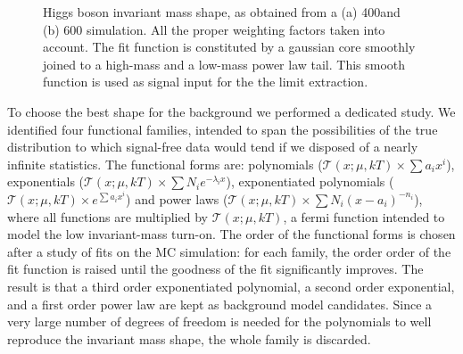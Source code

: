 \begin{figure}[htb]
\begin{center}
  \caption{Higgs boson invariant mass shape, as obtained from a (a) 400\GeVcc and (b) 600\GeVcc
           simulation. All the proper weighting factors taken into account. The fit function is
           constituted by a gaussian core smoothly joined to a high-mass and a low-mass power law
           tail. This smooth function is used as signal input for the  the limit extraction.}
  \label{fig:signalShape}
\end{center}
\end{figure}

To choose the best shape for the background we performed a dedicated study. We identified four
functional families, intended to span the possibilities of the true distribution to which
signal-free data would tend if we disposed of a nearly infinite statistics. The functional forms are:
polynomials ($\mathcal{T}(x;\mu,kT) \times \sum a_i x^i $), exponentials
($\mathcal{T}(x;\mu,kT) \times \sum N_i e^{-\lambda_i x}$), exponentiated polynomials
($\mathcal{T}(x;\mu,kT) \times e^{\sum a_i x^i}$) and power laws
($\mathcal{T}(x;\mu,kT) \times \sum N_i (x-a_i)^{-n_i}$), where all functions are multiplied by
$\mathcal{T}(x;\mu,kT)$, a fermi function intended to model the low invariant-mass turn-on. The
order of the functional forms is chosen after a study of fits on the MC simulation: for each family,
the order order of the fit function is raised until the goodness of the fit significantly improves.
The result is that a third order exponentiated polynomial, a second order exponential,  and a first
order power law are kept as background model candidates. Since a very  large number of degrees of
freedom is needed for the polynomials to well reproduce the invariant mass shape, the whole family
is discarded.

